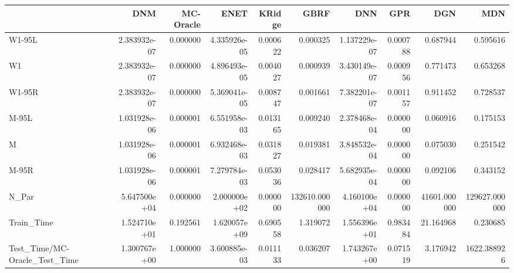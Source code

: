 \begin{tabular}{lrrrrrrrrr}
\toprule
{} &           DNM &  MC-Oracle &          ENET &    KRidge &           GBRF &           DNN &       GPR &           DGN &            MDN \\
\midrule
W1-95L                        &  2.383932e-07 &   0.000000 &  4.335926e-05 &  0.000622 &       0.000325 &  1.137229e-07 &  0.000788 &      0.687944 &       0.595616 \\
W1                            &  2.383932e-07 &   0.000000 &  4.896493e-05 &  0.004027 &       0.000939 &  3.430149e-07 &  0.000956 &      0.771473 &       0.653268 \\
W1-95R                        &  2.383932e-07 &   0.000000 &  5.369041e-05 &  0.008747 &       0.001661 &  7.382201e-07 &  0.001157 &      0.911452 &       0.728537 \\
M-95L                         &  1.031928e-06 &   0.000001 &  6.551958e-03 &  0.013165 &       0.009240 &  2.378468e-04 &  0.000000 &      0.060916 &       0.175153 \\
M                             &  1.031928e-06 &   0.000001 &  6.932468e-03 &  0.031827 &       0.019381 &  3.848532e-04 &  0.000000 &      0.075030 &       0.251542 \\
M-95R                         &  1.031928e-06 &   0.000001 &  7.279784e-03 &  0.053036 &       0.028417 &  5.682935e-04 &  0.000000 &      0.092106 &       0.343152 \\
N\_Par                         &  5.647500e+04 &   0.000000 &  2.000000e+02 &  0.000000 &  132610.000000 &  4.160100e+04 &  0.000000 &  41601.000000 &  129627.000000 \\
Train\_Time                    &  1.524710e+01 &   0.192561 &  1.620057e+09 &  0.690558 &       1.319072 &  1.556396e+01 &  0.983484 &     21.164968 &       0.230685 \\
Test\_Time/MC-Oracle\_Test\_Time &  1.300767e+00 &   1.000000 &  3.600885e-03 &  0.011133 &       0.036207 &  1.743267e+00 &  0.071519 &      3.176942 &    1622.388926 \\
\bottomrule
\end{tabular}
